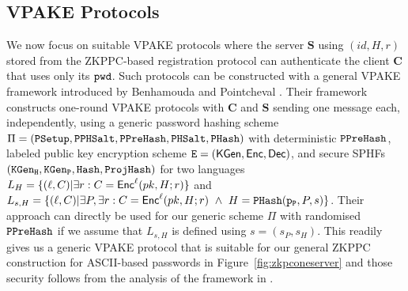 \subsection{VPAKE Protocols} \label{sec:vpake}
We now focus on suitable VPAKE protocols where the server $\bm{S}$ using $(id, H, r)$ stored from the ZKPPC-based registration protocol can authenticate the client $\bm{C}$ that uses only its $\mathtt{pwd}$. 
Such protocols can be constructed with a general VPAKE framework introduced by Benhamouda and Pointcheval \cite{BenhamoudaP13}. 
Their framework constructs one-round VPAKE protocols with $\bm{C}$ and $\bm{S}$ sending one message each, independently, using a generic password hashing scheme $\Pi=(\mathtt{PSetup},\allowbreak\mathtt{PPHSalt},\allowbreak\mathtt{PPreHash},\mathtt{PHSalt},\allowbreak\mathtt{PHash})$ with deterministic $\mathtt{PPreHash}$, labeled public key encryption scheme $\mathtt{E} = (\mathsf{KGen},\allowbreak \mathsf{Enc}, \mathsf{Dec})$, and secure SPHFs $(\mathtt{KGen_H},\allowbreak\mathtt{KGen_P},\allowbreak\mathtt{Hash},\allowbreak\mathtt{ProjHash})$ for two languages $L_H = \{(\ell, C) | \exists r : C = \mathsf{Enc}^\ell(pk, H; r)\}$ and $L_{s,H}  = \{(\ell, C) | \exists P, \exists r : C = \mathsf{Enc}^\ell(pk, H; r)\ \wedge\ H = \mathtt{PHash}(\mathtt{p_P},\allowbreak P, s)\}$. 
Their approach can directly be used for our generic scheme $\Pi$ with randomised $\mathtt{PPreHash}$ if we assume that $L_{s,H}$ is defined using $s=(s_P,s_H)$. 
This readily gives us a generic VPAKE protocol that is suitable for our general ZKPPC construction for ASCII-based passwords in Figure~\ref{fig:zkpconeserver} and those security follows from the analysis of the framework in \cite{BenhamoudaP13}.

